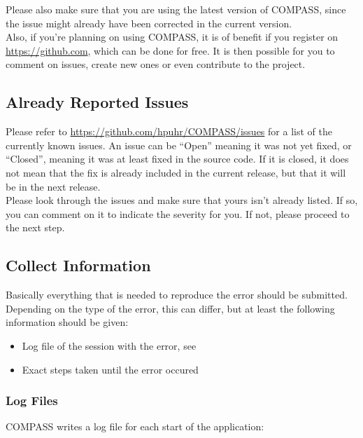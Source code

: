 Please also make sure that you are using the latest version of COMPASS, since the issue might already have been corrected in the current version. \\

Also, if you're planning on using COMPASS, it is of benefit if you register on \url{https://github.com}, which can be done for free. It is then possible for you to comment on issues, create new ones or even contribute to the project.

\subsection{Already Reported Issues}

Please refer to \url{https://github.com/hpuhr/COMPASS/issues} for a list of the currently known issues. An issue can be ``Open'' meaning it was not yet fixed, or ``Closed'', meaning it was at least fixed in the source code. If it is closed, it does not mean that the fix is already included in the current release, but that it will be in the next release. \\

Please look through the issues and make sure that yours isn't already listed. If so, you can comment on it to indicate the severity for you. If not, please proceed to the next step.

\subsection{Collect Information}

Basically everything that is needed to reproduce the error should be submitted. Depending on the type of the error, this can differ, but at least the following information should be given:

\begin{itemize}  
\item Log file of the session with the error, see 
\item Exact steps taken until the error occured
\end{itemize} 

\subsubsection{Log Files}
\label{sec:issues_log_files}

COMPASS writes a log file for each start of the application:

